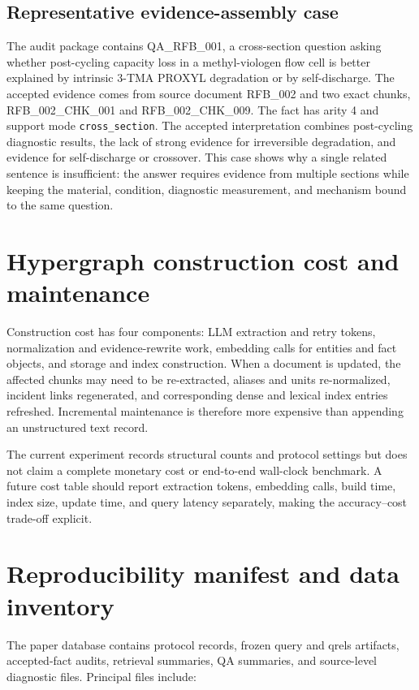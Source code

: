 \subsection{Representative evidence-assembly case}

The audit package contains QA\_RFB\_001, a cross-section question asking whether post-cycling capacity loss in a methyl-viologen flow cell is better explained by intrinsic 3-TMA PROXYL degradation or by self-discharge. The accepted evidence comes from source document RFB\_002 and two exact chunks, RFB\_002\_CHK\_001 and RFB\_002\_CHK\_009. The fact has arity 4 and support mode \texttt{cross\_section}. The accepted interpretation combines post-cycling diagnostic results, the lack of strong evidence for irreversible degradation, and evidence for self-discharge or crossover. This case shows why a single related sentence is insufficient: the answer requires evidence from multiple sections while keeping the material, condition, diagnostic measurement, and mechanism bound to the same question.

\section{Hypergraph construction cost and maintenance}

Construction cost has four components: LLM extraction and retry tokens, normalization and evidence-rewrite work, embedding calls for entities and fact objects, and storage and index construction. When a document is updated, the affected chunks may need to be re-extracted, aliases and units re-normalized, incident links regenerated, and corresponding dense and lexical index entries refreshed. Incremental maintenance is therefore more expensive than appending an unstructured text record.

The current experiment records structural counts and protocol settings but does not claim a complete monetary cost or end-to-end wall-clock benchmark. A future cost table should report extraction tokens, embedding calls, build time, index size, update time, and query latency separately, making the accuracy--cost trade-off explicit.

\section{Reproducibility manifest and data inventory}

The paper database contains protocol records, frozen query and qrels artifacts, accepted-fact audits, retrieval summaries, QA summaries, and source-level diagnostic files. Principal files include:

